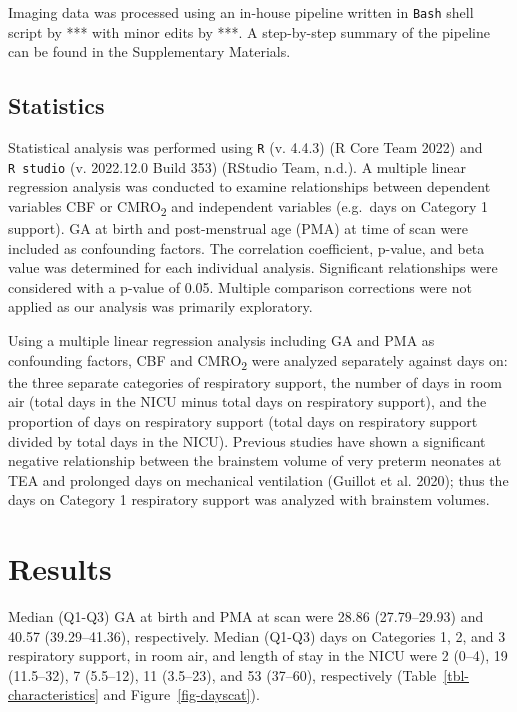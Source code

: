 \documentclass[
  letterpaper,
  DIV=11,
  numbers=noendperiod]{scrartcl}
\begin{document}
Imaging data was processed using an in-house pipeline written in
\texttt{Bash} shell script by *** with minor edits by ***. A
step-by-step summary of the pipeline can be found in the Supplementary
Materials.

\subsection{Statistics}\label{statistics}

Statistical analysis was performed using \texttt{R} (v. 4.4.3) (R Core
Team 2022) and \texttt{R\ studio} (v. 2022.12.0 Build 353) (RStudio
Team, n.d.). A multiple linear regression analysis was conducted to
examine relationships between dependent variables CBF or
CMRO\textsubscript{2} and independent variables (e.g.~days on Category 1
support). GA at birth and post-menstrual age (PMA) at time of scan were
included as confounding factors. The correlation coefficient, p-value,
and beta value was determined for each individual analysis. Significant
relationships were considered with a p-value of 0.05. Multiple
comparison corrections were not applied as our analysis was primarily
exploratory.

Using a multiple linear regression analysis including GA and PMA as
confounding factors, CBF and CMRO\textsubscript{2} were analyzed
separately against days on: the three separate categories of respiratory
support, the number of days in room air (total days in the NICU minus
total days on respiratory support), and the proportion of days on
respiratory support (total days on respiratory support divided by total
days in the NICU). Previous studies have shown a significant negative
relationship between the brainstem volume of very preterm neonates at
TEA and prolonged days on mechanical ventilation (Guillot et al. 2020);
thus the days on Category 1 respiratory support was analyzed with
brainstem volumes.

\section{Results}\label{results}

Median (Q1-Q3) GA at birth and PMA at scan were 28.86 (27.79--29.93) and
40.57 (39.29--41.36), respectively. Median (Q1-Q3) days on Categories 1,
2, and 3 respiratory support, in room air, and length of stay in the
NICU were 2 (0--4), 19 (11.5--32), 7 (5.5--12), 11 (3.5--23), and 53
(37--60), respectively (Table~\ref{tbl-characteristics} and
Figure~\ref{fig-dayscat}).
\end{document}
